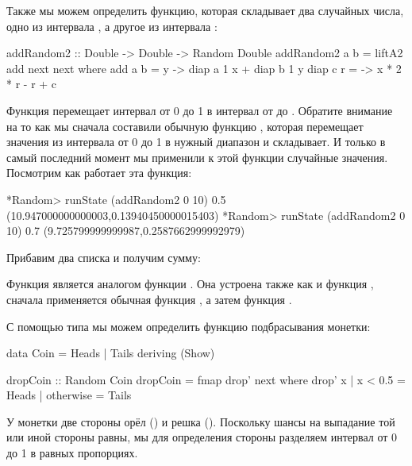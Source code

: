 Также мы можем определить функцию, которая складывает два случайных
числа, одно из интервала \In{[-1+a, 1+a]}, а другое из интервала
\In{[-2+b,2+b]}:


\begin{code}
addRandom2 :: Double -> Double -> Random Double
addRandom2 a b = liftA2 add next next
    where add  a b = \x y -> diap a 1 x + diap b 1 y
          diap c r = \x   -> x * 2 * r - r + c
\end{code}

Функция  перемещает интервал от 0 до 1 в интервал от 
до . Обратите внимание на то как мы сначала составили обычную
функцию , которая перемещает значения из интервала от 0 до 1 в
нужный диапазон и складывает. И только в самый последний момент мы
применили к этой функции случайные значения. Посмотрим как работает эта
функция:


\begin{code}
*Random> runState (addRandom2 0 10) 0.5
(10.947000000000003,0.13940450000015403)
*Random> runState (addRandom2 0 10) 0.7
(9.725799999999987,0.2587662999992979)
\end{code}

Прибавим два списка и получим сумму:



Функция  является аналогом функции . Она
устроена также как и функция , сначала применяется обычная
функция , а затем функция .

С помощью типа  мы можем определить функцию подбрасывания
монетки:


\begin{code}
data Coin = Heads | Tails
    deriving (Show)

dropCoin :: Random Coin
dropCoin = fmap drop' next
    where drop' x 
            | x < 0.5   = Heads
            | otherwise = Tails                    
\end{code}

У монетки две стороны орёл () и решка (). Поскольку
шансы на выпадание той или иной стороны равны, мы для определения
стороны разделяем интервал от 0 до 1 в равных пропорциях.

